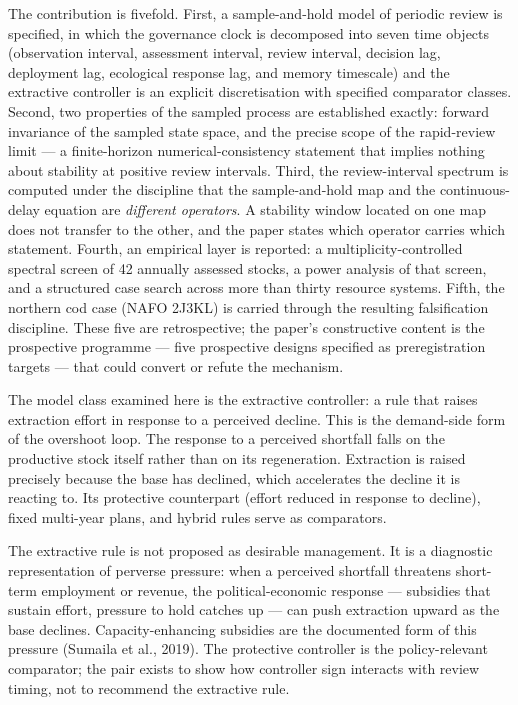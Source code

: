 \documentclass[11pt]{article}
\begin{document}
The contribution is fivefold. First, a sample-and-hold model of periodic
review is specified, in which the governance clock is decomposed into
seven time objects (observation interval, assessment interval, review
interval, decision lag, deployment lag, ecological response lag, and
memory timescale) and the extractive controller is an explicit
discretisation with specified comparator classes. Second, two properties
of the sampled process are established exactly: forward invariance of
the sampled state space, and the precise scope of the rapid-review limit
--- a finite-horizon numerical-consistency statement that implies
nothing about stability at positive review intervals. Third, the
review-interval spectrum is computed under the discipline that the
sample-and-hold map and the continuous-delay equation are
\emph{different operators}. A stability window located on one map does
not transfer to the other, and the paper states which operator carries
which statement. Fourth, an empirical layer is reported: a multiplicity-controlled spectral screen of 42
annually assessed stocks, a power analysis of that screen, and a
structured case search across more than thirty resource systems. Fifth,
the northern cod case (NAFO 2J3KL) is carried through the resulting
falsification discipline. These five are retrospective; the paper's
constructive content is the prospective programme --- five prospective designs
specified as preregistration targets --- that could
convert or refute the mechanism.

The model class examined here is the extractive controller: a rule that
raises extraction effort in response to a perceived decline. This is the
demand-side form of the overshoot loop. The response to a perceived
shortfall falls on the productive stock itself rather than on its
regeneration. Extraction is raised precisely because the base has
declined, which accelerates the decline it is reacting to. Its
protective counterpart (effort reduced in response to decline), fixed
multi-year plans, and hybrid rules serve as comparators.

The extractive rule is not proposed as desirable management. It is a diagnostic representation of perverse pressure: when a perceived shortfall threatens short-term employment or revenue, the political-economic response --- subsidies that sustain effort, pressure to hold catches up --- can push extraction upward as the base declines. Capacity-enhancing subsidies are the documented form of this pressure (Sumaila et al., 2019). The protective controller is the policy-relevant comparator; the pair exists to show how controller sign interacts with review timing, not to recommend the extractive rule.
\end{document}
